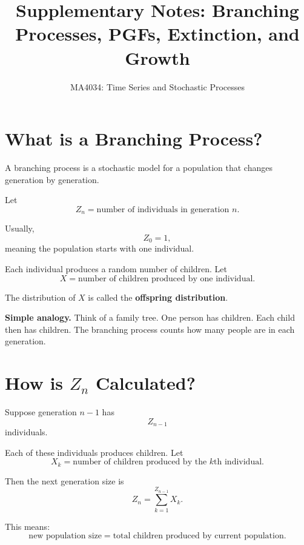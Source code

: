 \documentclass[12pt,a4paper]{article}
\title{\textbf{Supplementary Notes: Branching Processes, PGFs, Extinction, and Growth}}
\author{MA4034: Time Series and Stochastic Processes}
\date{}
\theoremstyle{notestyle}
\begin{document}
\maketitle

\section{What is a Branching Process?}

A branching process is a stochastic model for a population that changes generation by generation.

Let
\[
Z_n=\text{number of individuals in generation }n.
\]

Usually,
\[
Z_0=1,
\]
meaning the population starts with one individual.

Each individual produces a random number of children. Let
\[
X=\text{number of children produced by one individual}.
\]

The distribution of $X$ is called the \textbf{offspring distribution}.

\begin{center}
\end{center}

\textbf{Simple analogy.} Think of a family tree. One person has children. Each child then has children. The branching process counts how many people are in each generation.

\section{How is $Z_n$ Calculated?}

Suppose generation $n-1$ has
\[
Z_{n-1}
\]
individuals.

Each of these individuals produces children. Let
\[
X_k=\text{number of children produced by the }k\text{th individual}.
\]

Then the next generation size is
\[
Z_n=\sum_{k=1}^{Z_{n-1}}X_k.
\]

This means:
\[
\text{new population size}=\text{total children produced by current population}.
\]
\end{document}
